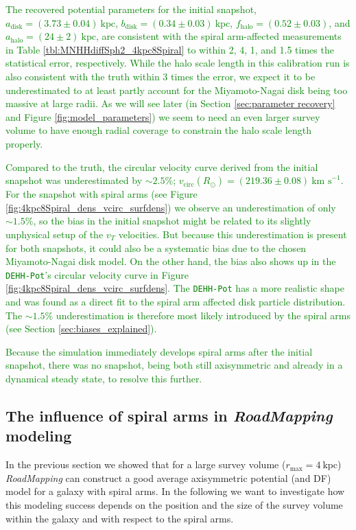 \documentclass[iop,revtex4,numberedappendix,appendixfloats]{emulateapj}
\newcommand{\RM}{{\sl RoadMapping}}
\newcommand{\NEW}[1]{\textcolor{Green}{#1}}
\begin{document}
\NEW{The recovered potential parameters for the initial snapshot, $a_\text{disk}=(3.73 \pm 0.04) ~\text{kpc}$, $b_\text{disk}=(0.34 \pm 0.03) ~\text{kpc}$, $f_\text{halo}=(0.52 \pm 0.03)$, and $a_\text{halo}=(24 \pm 2) ~\text{kpc}$, are consistent with the spiral arm-affected measurements in Table \ref{tbl:MNHHdiffSph2_4kpc8Spiral} to within 2, 4, 1, and 1.5 times the statistical error, respectively. While the halo scale length in this calibration run is also consistent with the truth within 3 times the error, we expect it to be underestimated to at least partly account for the Miyamoto-Nagai disk being too massive at large radii. As we will see later (in Section \ref{sec:parameter recovery} and Figure \ref{fig:model_parameters}) we seem to need an even larger survey volume to have enough radial coverage to constrain the halo scale length properly.}

\NEW{Compared to the truth, the circular velocity curve derived from the initial snapshot was underestimated by $\sim2.5\%$; $v_\text{circ}(R_\odot)=(219.36 \pm 0.08) ~\text{km s}^{-1}$. For the snapshot with spiral arms (see Figure \ref{fig:4kpc8Spiral_dens_vcirc_surfdens}) we observe an underestimation of only $\sim1.5\%$, so the bias in the initial snapshot might be related to its slightly unphysical setup of the $v_T$ velocities. But because this underestimation is present for both snapshots, it could also be a systematic bias due to the chosen Miyamoto-Nagai disk model. On the other hand, the bias also shows up in the \texttt{DEHH-Pot}'s circular velocity curve in Figure \ref{fig:4kpc8Spiral_dens_vcirc_surfdens}. The \texttt{DEHH-Pot} has a more realistic shape and was found as a direct fit to the spiral arm affected disk particle distribution. The $\sim1.5\%$ underestimation is therefore most likely introduced by the spiral arms (see Section \ref{sec:biases_explained}).}

\NEW{Because the simulation immediately develops spiral arms after the initial snapshot, there was no snapshot, being both still axisymmetric and already in a dynamical steady state, to resolve this further.}

\subsection{The influence of spiral arms in \RM{} modeling} \label{sec:results_part2}

In the previous section we showed that for a large survey volume ($r_\text{max}=4~\text{kpc}$) \RM{} can construct a good average axisymmetric potential (and DF) model for a galaxy with spiral arms. In the following we want to investigate how this modeling success depends on the position and the size of the survey volume within the galaxy and with respect to the spiral arms.
\end{document}
